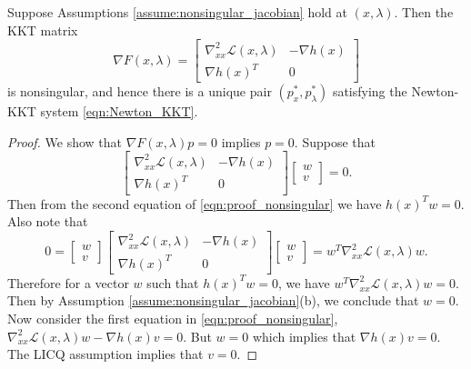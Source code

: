 \documentclass[11pt,a4paper]{article}
\begin{document}
\begin{proposition}\label{prop:nonsingular_jacobian}
Suppose Assumptions \ref{assume:nonsingular_jacobian} hold at $(x,\lambda)$. Then the KKT matrix 
\begin{equation*}
\nabla F(x,\lambda) = \left[
\begin{array}{cc} 
\nabla^2_{xx} \mathcal{L}(x,\lambda) & -\nabla h(x) \\ 
\nabla h(x)^T & 0
\end{array} \right]
\end{equation*}
is nonsingular, and hence there is a unique pair $(p_x^*,p_\lambda^*)$ satisfying the Newton-KKT system \eqref{eqn:Newton_KKT}.
\end{proposition}

\begin{proof}
We show that $\nabla F(x,\lambda) p = 0$ implies $p = 0$. Suppose that
\begin{equation}
\left[
\begin{array}{cc} 
\nabla^2_{xx} \mathcal{L}(x,\lambda) & -\nabla h(x) \\ 
\nabla h(x)^T & 0
\end{array} \right]
\left[\begin{array}{c} w \\ v \end{array}\right] = 0.\label{eqn:proof_nonsingular}
\end{equation}
Then from the second equation of \eqref{eqn:proof_nonsingular} we have $h(x)^Tw = 0$. Also note that
\begin{equation*}
0 = \left[\begin{array}{c} w \\ v \end{array}\right]
\left[
\begin{array}{cc} 
\nabla^2_{xx} \mathcal{L}(x,\lambda) & -\nabla h(x) \\ 
\nabla h(x)^T & 0
\end{array} \right]
\left[\begin{array}{c} w \\ v \end{array}\right] = w^T\nabla_{xx}^2\mathcal{L}(x,\lambda)w.
\end{equation*}
Therefore for a vector $w$ such that $h(x)^Tw = 0$, we have $w^T\nabla^2_{xx} \mathcal{L}(x,\lambda)w = 0$. Then by Assumption \ref{assume:nonsingular_jacobian}(b), we conclude that $w = 0$. Now consider the first equation in \eqref{eqn:proof_nonsingular}, $\nabla^2_{xx} \mathcal{L}(x,\lambda)w-\nabla h(x)v = 0$. But $w = 0$ which implies that $\nabla h(x) v = 0$. The LICQ assumption implies that $v = 0$.
\end{proof}
\end{document}
